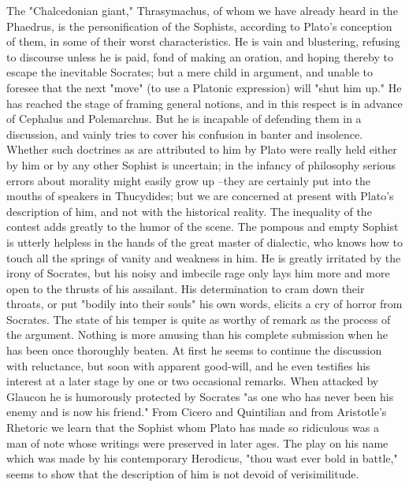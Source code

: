 The "Chalcedonian giant," Thrasymachus, of whom we have already heard in the Phaedrus, is the personification of the Sophists, according to Plato's conception of them, in some of their worst characteristics. He is vain and blustering, refusing to discourse unless he is paid, fond of making an oration, and hoping thereby to escape the inevitable Socrates; but a mere child in argument, and unable to foresee that the next "move" (to use a Platonic expression) will "shut him up." He has reached the stage of framing general notions, and in this respect is in advance of Cephalus and Polemarchus. But he is incapable of defending them in a discussion, and vainly tries to cover his confusion in banter and insolence. Whether such doctrines as are attributed to him by Plato were really held either by him or by any other Sophist is uncertain; in the infancy of philosophy serious errors about morality might easily grow up --they are certainly put into the mouths of speakers in Thucydides; but we are concerned at present with Plato's description of him, and not with the historical reality. The inequality of the contest adds greatly to the humor of the scene. The pompous and empty Sophist is utterly helpless in the hands of the great master of dialectic, who knows how to touch all the springs of vanity and weakness in him. He is greatly irritated by the irony of Socrates, but his noisy and imbecile rage only lays him more and more open to the thrusts of his assailant. His determination to cram down their throats, or put "bodily into their souls" his own words, elicits a cry of horror from Socrates. The state of his temper is quite as worthy of remark as the process of the argument. Nothing is more amusing than his complete submission when he has been once thoroughly beaten. At first he seems to continue the discussion with reluctance, but soon with apparent good-will, and he even testifies his interest at a later stage by one or two occasional remarks. When attacked by Glaucon he is humorously protected by Socrates "as one who has never been his enemy and is now his friend." From Cicero and Quintilian and from Aristotle's Rhetoric we learn that the Sophist whom Plato has made so ridiculous was a man of note whose writings were preserved in later ages. The play on his name which was made by his contemporary Herodicus, "thou wast ever bold in battle," seems to show that the description of him is not devoid of verisimilitude.

